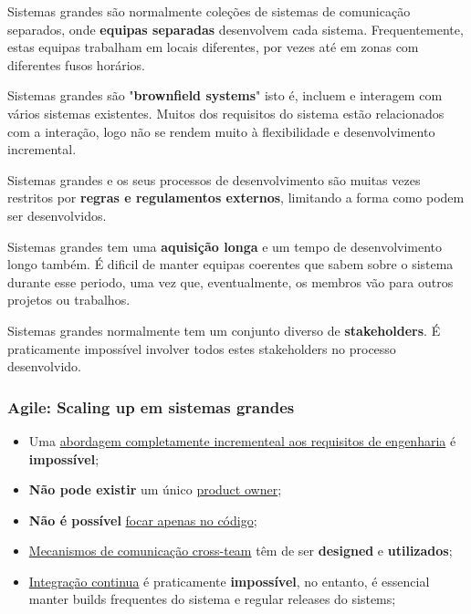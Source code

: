 \documentclass{article}
\begin{document}
Sistemas grandes são normalmente coleções de sistemas de comunicação separados,
onde \textbf{equipas separadas} desenvolvem cada sistema. Frequentemente,
estas equipas trabalham em locais diferentes, por vezes até em zonas com diferentes fusos horários.

\vspace{2mm}

Sistemas grandes são "\textbf{brownfield systems}" isto é,
incluem e interagem com vários sistemas existentes.
Muitos dos requisitos do sistema estão relacionados com a interação, logo
não se rendem muito à flexibilidade e desenvolvimento incremental.

\pagebreak

Sistemas grandes e os seus processos de desenvolvimento são
muitas vezes restritos por \textbf{regras e regulamentos externos},
limitando a forma como podem ser desenvolvidos.

\vspace{2mm}

Sistemas grandes tem uma \textbf{aquisição longa} e
um tempo de desenvolvimento longo também. É dificil de manter equipas
coerentes que sabem sobre o sistema durante esse periodo, uma vez que,
eventualmente, os membros vão para outros projetos ou trabalhos.

\vspace{2mm}

Sistemas grandes normalmente tem um conjunto diverso de
\textbf{stakeholders}. É praticamente impossível involver todos estes
stakeholders no processo desenvolvido.

\subsubsection{Agile: Scaling up em sistemas grandes}

\begin{itemize}
  \item Uma \uline{abordagem completamente incrementeal aos requisitos de engenharia} é \textbf{impossível};
  \item \textbf{Não pode existir} um único \uline{product owner};
  \item \textbf{Não é possível} \uline{focar apenas no código};
  \item \uline{Mecanismos de comunicação cross-team} têm de ser \textbf{designed} e \textbf{utilizados};
  \item \uline{Integração continua} é praticamente \textbf{impossível}, no entanto, é essencial
  manter builds frequentes do sistema e regular releases do sistems;
\end{itemize}
\end{document}

